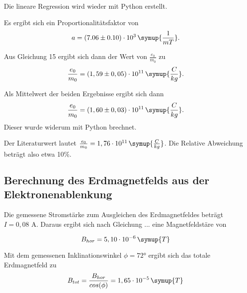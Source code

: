 Die lineare Regression wird wieder mit Python erstellt.

Es ergibt sich ein Proportionalitätsfaktor von
\begin{equation*}
  a = (7.06 \pm 0.10)\cdot 10^3\, \symup{\frac{1}{mT}}.
\end{equation*}

Aus Gleichung 15 ergibt sich dann der Wert von $\frac{e_0}{m_0}$ zu
\begin{equation*}
  \frac{e_0}{m_0} = (1,59 \pm 0,05)\cdot 10^{11} \, \symup{\frac{C}{kg}}.
\end{equation*}

Als Mittelwert der beiden Ergebnisse ergibt sich dann
\begin{equation*}
  \frac{e_0}{m_0} = (1,60 \pm 0,03)\cdot 10^{11} \, \symup{\frac{C}{kg}}.
\end{equation*}
Dieser wurde widerum mit Python brechnet.

Der Literaturwert lautet $\frac{e_0}{m_0} = 1,76 \cdot 10^{11} \, \symup{\frac{C}{kg}}$.
Die Relative Abweichung beträgt also etwa 10\%.

\subsection{Berechnung des Erdmagnetfelds aus der Elektronenablenkung}

Die gemessene Stromstärke zum Ausgleichen des Erdmagnetfeldes beträgt $I = 0,08$ A.
Daraus ergibt sich nach Gleichung ... eine Magnetfeldstäre von

\begin{equation*}
  B_{hor} = 5,10 \cdot 10^{-6} \, \symup{T}
\end{equation*}

Mit dem gemessenen Inklinationswinkel $\phi = 72°$ ergibt sich das totale
Erdmagnetfeld zu
\begin{equation*}
  B_{tot} = \frac{B_{hor}}{cos(\phi)} = 1,65 \cdot 10^{-5} \, \symup{T}
\end{equation*}
